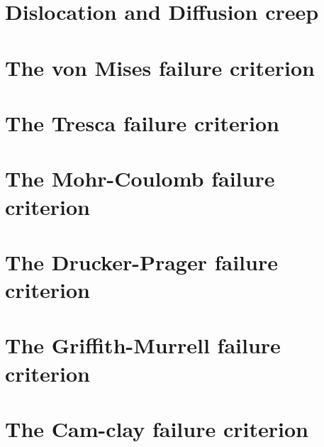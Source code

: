 \section{Dislocation and Diffusion creep}


\section{The von Mises failure criterion}\label{sec:vMcriterion}


\section{The Tresca failure criterion}\label{sec:trcriterion}


\section{The Mohr-Coulomb failure criterion}\label{sec:mccriterion}


\section{The Drucker-Prager failure criterion \label{sec:dpcriterion}}


\section{The Griffith-Murrell failure criterion}


\section{The Cam-clay failure criterion}


